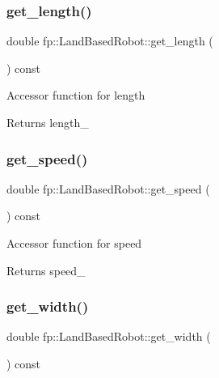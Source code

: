 \subsubsection{\texorpdfstring{get\+\_\+length()}{get\_length()}}
{\footnotesize\ttfamily double fp\+::\+Land\+Based\+Robot\+::get\+\_\+length (\begin{DoxyParamCaption}{ }\end{DoxyParamCaption}) const\hspace{0.3cm}{\ttfamily [inline]}}

Accessor function for length \begin{DoxyReturn}{Returns}
length\+\_\+ 
\end{DoxyReturn}
\mbox{\label{classfp_1_1_land_based_robot_a44fed3a00505f6679ff8505aebae4505}} 
\subsubsection{\texorpdfstring{get\+\_\+speed()}{get\_speed()}}
{\footnotesize\ttfamily double fp\+::\+Land\+Based\+Robot\+::get\+\_\+speed (\begin{DoxyParamCaption}{ }\end{DoxyParamCaption}) const\hspace{0.3cm}{\ttfamily [inline]}}

Accessor function for speed \begin{DoxyReturn}{Returns}
speed\+\_\+ 
\end{DoxyReturn}
\mbox{\label{classfp_1_1_land_based_robot_a523b439167030a7ab1e0e7f6c8d42315}} 
\subsubsection{\texorpdfstring{get\+\_\+width()}{get\_width()}}
{\footnotesize\ttfamily double fp\+::\+Land\+Based\+Robot\+::get\+\_\+width (\begin{DoxyParamCaption}{ }\end{DoxyParamCaption}) const\hspace{0.3cm}{\ttfamily [inline]}}

